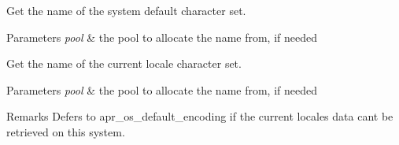 Get the name of the system default character set. 
\begin{DoxyParams}{Parameters}
{\em pool} & the pool to allocate the name from, if needed\\
\hline
\end{DoxyParams}
Get the name of the current locale character set. 
\begin{DoxyParams}{Parameters}
{\em pool} & the pool to allocate the name from, if needed \\
\hline
\end{DoxyParams}
\begin{DoxyRemark}{Remarks}
Defers to apr\+\_\+os\+\_\+default\+\_\+encoding if the current locale\textquotesingle{}s data can\textquotesingle{}t be retrieved on this system. 
\end{DoxyRemark}
